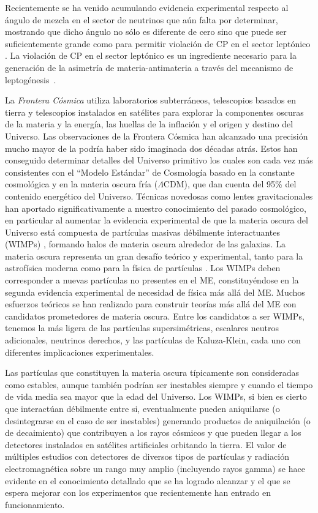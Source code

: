 Recientemente se ha venido acumulando evidencia experimental respecto
al ángulo de mezcla en el sector de neutrinos que aún falta por
determinar, mostrando que dicho ángulo no sólo es diferente de cero
sino que puede ser suficientemente grande como para permitir violación
de CP en el sector leptónico \cite{Schwetz:2011zk}. La violación de CP en el
sector leptónico es un ingrediente necesario para la generación de la asimetría
de materia-antimateria a través del mecanismo de
leptogénesis~\cite{Davidson:2008bu}.


La \emph{Frontera Cósmica} utiliza laboratorios subterráneos,
telescopios basados en tierra y telescopios instalados en satélites
para explorar la componentes oscuras de la materia y la energía, las huellas
de la inflación y el origen y destino del Universo. Las observaciones
de la Frontera Cósmica han alcanzado una precisión mucho mayor de la
podría haber sido imaginada dos décadas atrás. Estos han conseguido
determinar detalles del Universo primitivo los cuales son cada vez más
consistentes con el ``Modelo Estándar'' de Cosmología basado en la
constante cosmológica y en la materia oscura fría ($\Lambda$CDM), que
dan cuenta del 95\% del contenido energético del Universo. Técnicas
novedosas como lentes gravitacionales han aportado significativamente
a nuestro conocimiento del pasado cosmológico, en particular al
aumentar la evidencia experimental de que la materia oscura del
Universo está compuesta de partículas masivas débilmente
interactuantes (WIMPs) \cite{Bertone:2004pz,Jungman:1995df}, formando
halos de materia oscura alrededor de las galaxias.
La materia oscura representa un gran desafío teórico y experimental,
tanto para la astrofísica moderna como para la física de partículas
\cite{Bertone:2004pz, Amsler:2008zzb, Bertone:2010, Jungman:1995df}.
Los WIMPs deben corresponder a nuevas partículas no presentes en el
ME, constituyéndose en la segunda evidencia experimental de necesidad
de física más allá del ME.  Muchos esfuerzos teóricos se han realizado
para construir teorías más allá del ME con candidatos
prometedores de materia oscura. Entre los candidatos a ser WIMPs,
tenemos la más ligera de las partículas supersimétricas, escalares
neutros adicionales, neutrinos derechos, y las partículas de
Kaluza-Klein, cada uno con diferentes implicaciones experimentales.


Las partículas que constituyen la materia oscura típicamente son
consideradas como estables, aunque también podrían ser
inestables siempre y cuando el tiempo de vida media sea mayor que la
edad del Universo. Los WIMPs, si bien es cierto que interactúan débilmente
entre si, eventualmente pueden aniquilarse (o desintegrarse en el caso
de ser inestables) generando productos de aniquilación (o de decaimiento)
que contribuyen a los rayos cósmicos y que pueden llegar a los detectores
instalados en satélites artificiales orbitando la tierra. El valor de múltiples
estudios con detectores de diversos tipos de partículas y radiación
electromagnética sobre un rango muy amplio (incluyendo rayos gamma) se
hace evidente en el conocimiento detallado que se ha logrado alcanzar
y el que se espera mejorar con los experimentos que recientemente han
entrado en funcionamiento.

